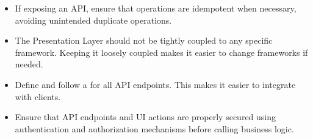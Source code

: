 \documentclass[letterpaper,10pt,english]{sphinxhowto}
\begin{document}
\begin{itemize}
\begin{description}
\end{description}

\item {} \begin{description}
\sphinxAtStartPar
If exposing an API, ensure that  operations are idempotent when necessary, avoiding unintended duplicate operations.

\end{description}

\item {} \begin{description}
\sphinxAtStartPar
The Presentation Layer should not be tightly coupled to any specific framework. Keeping it loosely coupled makes it easier to change frameworks if needed.

\end{description}

\item {} \begin{description}
\sphinxAtStartPar
Define and follow a  for all API endpoints. This makes it easier to integrate with clients.

\end{description}

\item {} \begin{description}
\sphinxAtStartPar
Ensure that API endpoints and UI actions are properly secured using authentication and authorization mechanisms before calling business logic.

\end{description}

\end{itemize}
\end{document}
